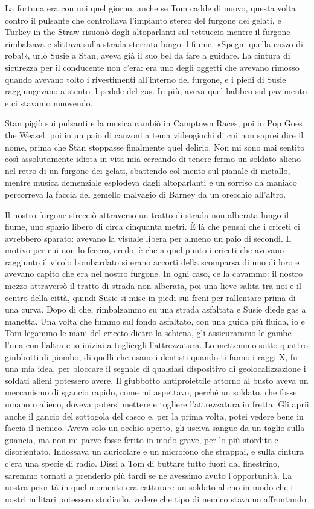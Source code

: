 La fortuna era con noi quel giorno, anche se Tom cadde di nuovo, questa
volta contro il pulsante che controllava l'impianto stereo del furgone
dei gelati, e Turkey in the Straw risuonò dagli altoparlanti sul
tettuccio mentre il furgone rimbalzava e slittava sulla strada sterrata
lungo il fiume. «Spegni quella cazzo di roba!», urlò Susie a Stan, aveva
già il suo bel da fare a guidare. La cintura di sicurezza per il
conducente non c'era: era uno degli oggetti che avevano rimosso quando
avevano tolto i rivestimenti all'interno del furgone, e i piedi di Susie
raggiungevano a stento il pedale del gas. In più, aveva quel babbeo sul
pavimento e ci stavamo muovendo.

Stan pigiò sui pulsanti e la musica cambiò in Camptown Races, poi in Pop
Goes the Weasel, poi in un paio di canzoni a tema videogiochi di cui non
saprei dire il nome, prima che Stan stoppasse finalmente quel delirio.
Non mi sono mai sentito così assolutamente idiota in vita mia cercando
di tenere fermo un soldato alieno nel retro di un furgone dei gelati,
sbattendo col mento sul pianale di metallo, mentre musica demenziale
esplodeva dagli altoparlanti e un sorriso da maniaco percorreva la
faccia del gemello malvagio di Barney da un orecchio all'altro.

Il nostro furgone sfrecciò attraverso un tratto di strada non alberata
lungo il fiume, uno spazio libero di circa cinquanta metri. È là che
pensai che i criceti ci avrebbero sparato: avevano la visuale libera per
almeno un paio di secondi. Il motivo per cui non lo fecero, credo, è che
a quel punto i criceti che avevano raggiunto il vicolo bombardato si
erano accorti della scomparsa di uno di loro e avevano capito che era
nel nostro furgone. In ogni caso, ce la cavammo: il nostro mezzo
attraversò il tratto di strada non alberata, poi una lieve salita tra
noi e il centro della città, quindi Susie si mise in piedi sui freni per
rallentare prima di una curva. Dopo di che, rimbalzammo su una strada
asfaltata e Susie diede gas a manetta. Una volta che fummo sul fondo
asfaltato, con una guida più fluida, io e Tom legammo le mani del
criceto dietro la schiena, gli assicurammo le gambe l'una con l'altra e
io iniziai a togliergli l'attrezzatura. Lo mettemmo sotto quattro
giubbotti di piombo, di quelli che usano i dentisti quando ti fanno i
raggi X, fu una mia idea, per bloccare il segnale di qualsiasi
dispositivo di geolocalizzazione i soldati alieni potessero avere. Il
giubbotto antiproiettile attorno al busto aveva un meccanismo di sgancio
rapido, come mi aspettavo, perché un soldato, che fosse umano o alieno,
doveva potersi mettere e togliere l'attrezzatura in fretta. Gli aprii
anche il gancio del sottogola del casco e, per la prima volta, potei
vedere bene in faccia il nemico. Aveva solo un occhio aperto, gli usciva
sangue da un taglio sulla guancia, ma non mi parve fosse ferito in modo
grave, per lo più stordito e disorientato. Indossava un auricolare e un
microfono che strappai, e sulla cintura c'era una specie di radio. Dissi
a Tom di buttare tutto fuori dal finestrino, saremmo tornati a prenderlo
più tardi se ne avessimo avuto l'opportunità. La nostra priorità in quel
momento era catturare un soldato alieno in modo che i nostri militari
potessero studiarlo, vedere che tipo di nemico stavamo affrontando.

